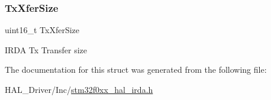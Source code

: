 \subsubsection{\texorpdfstring{Tx\+Xfer\+Size}{TxXferSize}}
{\footnotesize\ttfamily uint16\+\_\+t Tx\+Xfer\+Size}

I\+R\+DA Tx Transfer size 

The documentation for this struct was generated from the following file\+:\begin{DoxyCompactItemize}
\item 
H\+A\+L\+\_\+\+Driver/\+Inc/\hyperlink{stm32f0xx__hal__irda_8h}{stm32f0xx\+\_\+hal\+\_\+irda.\+h}\end{DoxyCompactItemize}
